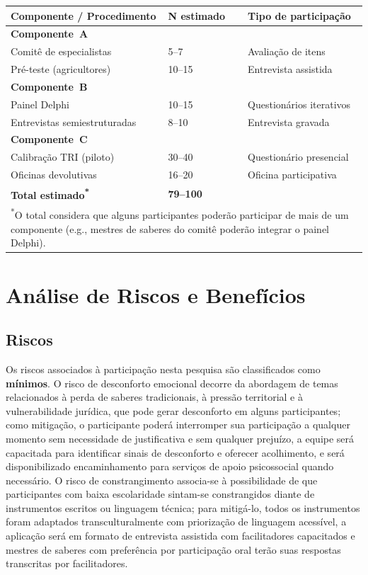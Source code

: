 \documentclass[12pt,a4paper,brazil]{article}
\begin{document}
\begin{longtable}{p{6cm}p{3cm}p{4cm}}
\toprule
\textbf{Componente / Procedimento} & \textbf{N estimado} & \textbf{Tipo de participação} \\
\midrule
\endhead
\textbf{Componente~A} & & \\
\quad Comitê de especialistas & 5--7 & Avaliação de itens \\
\quad Pré-teste (agricultores) & 10--15 & Entrevista assistida \\[0.3cm]
\textbf{Componente~B} & & \\
\quad Painel Delphi & 10--15 & Questionários iterativos \\
\quad Entrevistas semiestruturadas & 8--10 & Entrevista gravada \\[0.3cm]
\textbf{Componente~C} & & \\
\quad Calibração TRI (piloto) & 30--40 & Questionário presencial \\
\quad Oficinas devolutivas & 16--20 & Oficina participativa \\
\midrule
\textbf{Total estimado\textsuperscript{*}} & \textbf{79--100} & \\
\bottomrule
\multicolumn{3}{p{13cm}}{\footnotesize \textsuperscript{*}O total considera que alguns participantes poderão participar de mais de um componente (e.g., mestres de saberes do comitê poderão integrar o painel Delphi).} \\
\end{longtable}


\section{Análise de Riscos e Benefícios}

\subsection{Riscos}

Os riscos associados à participação nesta pesquisa são classificados como \textbf{mínimos}. O risco de desconforto emocional decorre da abordagem de temas relacionados à perda de saberes tradicionais, à pressão territorial e à vulnerabilidade jurídica, que pode gerar desconforto em alguns participantes; como mitigação, o participante poderá interromper sua participação a qualquer momento sem necessidade de justificativa e sem qualquer prejuízo, a equipe será capacitada para identificar sinais de desconforto e oferecer acolhimento, e será disponibilizado encaminhamento para serviços de apoio psicossocial quando necessário. O risco de constrangimento associa-se à possibilidade de que participantes com baixa escolaridade sintam-se constrangidos diante de instrumentos escritos ou linguagem técnica; para mitigá-lo, todos os instrumentos foram adaptados transculturalmente com priorização de linguagem acessível, a aplicação será em formato de entrevista assistida com facilitadores capacitados e mestres de saberes com preferência por participação oral terão suas respostas transcritas por facilitadores.
\end{document}

